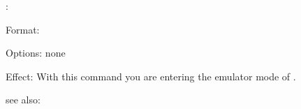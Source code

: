 \emul:

Format: 

Options: none

Effect: With this command you are entering the emulator mode of \RELFUN{}.

see also: \inter
